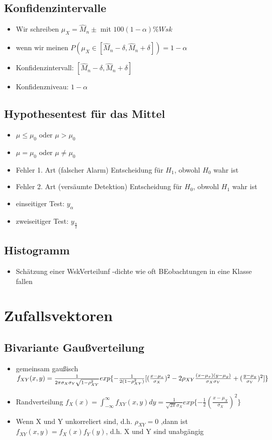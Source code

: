 \documentclass{article}
\begin{document}
\subsection{Konfidenzintervalle}
\begin{itemize}
\item Wir schreiben $\mu_X = \hat{M}_n \pm $ mit $100(1-\alpha)\% Wsk$
\item wenn wir meinen $P(\mu_X \in [\hat{M}_n - \delta,\hat{M}_n + \delta]) = 1 -\alpha $
\item Konfidenzintervall: $ [\hat{M}_n - \delta,\hat{M}_n + \delta]$
\item Konfidenzniveau: $1-\alpha$
\end{itemize}


\subsection{Hypothesentest für das Mittel}
\begin{itemize}
\item $\mu \leq \mu_0$ oder  $ \mu > \mu_0$ 
\item $\mu =\mu_0$ oder $\mu \neq \mu_0$ 
\item Fehler 1. Art (falscher Alarm) Entscheidung für $H_1$, obwohl $H_0$ wahr ist
\item Fehler 2. Art (versäumte Detektion) Entscheidung für $H_0$, obwohl $H_1$ wahr ist
\item einseitiger Test: $y_\alpha$
\item zweiseitiger Test: $y_\frac{\alpha}{2}$
\end{itemize}

\subsection{Histogramm}
\begin{itemize}
\item Schätzung einer WskVerteilunf -dichte wie oft BEobachtungen in eine Klasse fallen
\end{itemize}

\section{Zufallsvektoren}
\subsection{Bivariante Gau\ss verteilung}
\begin{itemize}
\item gemeinsam gau\ss isch $f_{XY}(x,y) = \\
 \frac{1}{2\pi\sigma_X\sigma_Y \sqrt{1-\rho_{XY}^2}} exp\{- \frac{1}{2(1-\rho_{XY}^2)} [(\frac{x-\mu_x}{\sigma_X})^2 - 2\rho_{XY} \frac{(x-\mu_x)(y-\mu_y)}{\sigma_X\sigma_Y}+(\frac{y-\mu_y}{\sigma_Y})^2] \}$
\item Randverteilung $f_X(x) = \int_{-\infty}^{\infty} f_{XY}(x,y) dy = \frac{1}{\sqrt{2\pi}\sigma_X} exp\{ - \frac{1}{2} (\frac{x-\mu_X}{\sigma_X})^2\}$
\item Wenn X und Y unkorreliert sind, d.h. $\rho_{XY} = 0$ ,dann ist $f_{XY}(x,y) = f_X(x)f_Y(y)$, d.h. X und Y sind unabgängig
\end{itemize}
\end{document}
